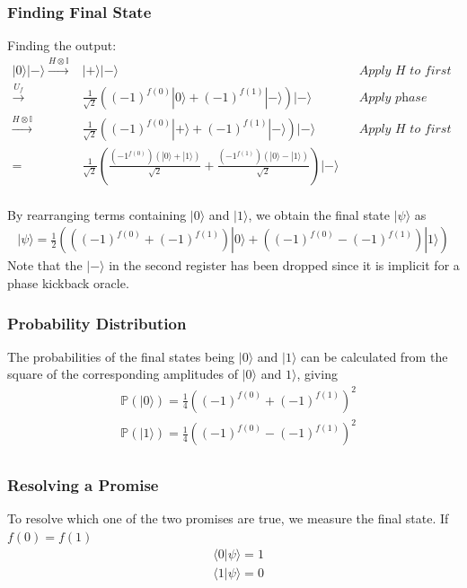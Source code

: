 \documentclass{article}
\begin{document}
    \subsubsection{Finding Final State}
    Finding the output: \\
    \begin{align*}
        |0\rangle|-\rangle \xrightarrow{H \otimes \mathbb{I}} &|+\rangle|-\rangle  && \textit{Apply H to first register} \\
        \xrightarrow{U_f} &\frac{1}{\sqrt{2}} ((-1)^{f(0)}|0\rangle + (-1)^{f(1)}|-\rangle) |-\rangle && \textit{Apply phase kickback}\\
        \xrightarrow{H \otimes \mathbb{I}} &\frac{1}{\sqrt{2}} ((-1)^{f(0)}|+\rangle + (-1)^{f(1)}|-\rangle) |-\rangle && \textit{Apply H to first register}\\
        =&\frac{1}{\sqrt{2}} \left( \frac{(-1^{f(0)})(|0\rangle + |1\rangle)}{\sqrt{2}} + \frac{(-1^{f(1)})(|0\rangle - |1\rangle)}{\sqrt{2}}\right)|-\rangle \\
    \end{align*}

    By rearranging terms containing $|0\rangle$ and $|1\rangle$, we obtain the final state $|\psi\rangle$ as
    \begin{align*}
        |\psi\rangle=\frac{1}{2} \left( ((-1)^{f(0)} + (-1)^{f(1)})|0\rangle + ((-1)^{f(0)} - (-1)^{f(1)})|1\rangle \right)
    \end{align*}
    Note that the $|-\rangle$ in the second register has been dropped since it is implicit for a phase kickback oracle.

    \subsubsection{Probability Distribution}
    The probabilities of the final states being $|0\rangle$ and $|1\rangle$ can be calculated from the square of the corresponding amplitudes of $|0\rangle$ and $1\rangle$, giving
    \begin{align*}
        &\mathds{P}(|0\rangle) = \frac{1}{4} \left( (-1)^{f(0)} + (-1)^{f(1)} \right) ^2 \\
        &\mathds{P}(|1\rangle) = \frac{1}{4} \left( (-1)^{f(0)} - (-1)^{f(1)} \right) ^2 \\
    \end{align*}

    \subsubsection{Resolving a Promise}
    To resolve which one of the two promises are true, we measure the final state.
    If $f(0)=f(1)$
    \begin{align*}
        & \langle 0 | \psi \rangle = 1\\
        & \langle 1| \psi \rangle = 0\\
    \end{align*}
\end{document}
